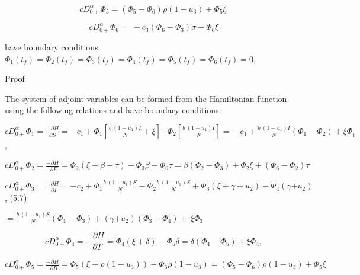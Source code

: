 \documentclass[10pt]{NSP1}
\begin{document}
\begin{equation}
{cD}_{0 +}^{\alpha}\Phi_{5} = \left( \Phi_{5} - \Phi_{6} \right)\rho\left( 1 - u_{3} \right) + \Phi_{5}\xi\ 

\end{equation}

\begin{equation}
{cD}_{0 +}^{\alpha}\Phi_{6} = \  - c_{3}\left( \Phi_{6} - \Phi_{3} \right)\sigma + \Phi_{6}\xi

\end{equation}

have boundary conditions $\Phi_{1}\left( t_{f} \right) = \Phi_{2}\left( t_{f} \right) = \Phi_{3}\left( t_{f} \right) = \Phi_{4}\left( t_{f} \right) = \Phi_{5}\left( t_{f} \right) = \Phi_{6}\left( t_{f} \right) = 0,$

Proof

The system of adjoint variables can be formed from the Hamiltonian function using the following relations and have boundary conditions.

${cD}_{0 +}^{\alpha}\Phi_{1} = \frac{- \partial H}{\partial S} = {- c}_{1} + \Phi_{1}\left\lbrack \frac{b\ \left( 1 - u_{1} \right)I}{N} + \xi \right\rbrack{- \Phi}_{2}\left\lbrack \frac{b\ \left( 1 - u_{1} \right)I}{N} \right\rbrack = \ {- c}_{1} + \frac{b\ \left( 1 - u_{1} \right)I}{N}\left( \Phi_{1} - \Phi_{2} \right) + {\xi\Phi}_{1}$,

${cD}_{0 +}^{\alpha}\Phi_{2} = \frac{- \partial H}{\ \ \partial E} = \Phi_{2}(\xi + \beta - \tau) - \Phi_{3}\beta + \Phi_{6}\tau = \beta\left( \Phi_{2} - \Phi_{3} \right) + \Phi_{2}\xi + (\Phi_{6} - \Phi_{2})\tau$

${cD}_{0 +}^{\alpha}\Phi_{3} = \frac{- \partial H}{\ \ \partial I} = - c_{2} + \Phi_{1}\frac{b\ \left( 1 - u_{1} \right)S}{N} - \Phi_{2}\frac{b\ \left( 1 - u_{1} \right)S}{N} + \Phi_{3}\left( \xi + \gamma + u_{2} \right) - \Phi_{4}(\gamma{+ u}_{2})$, (5.7)

$= \frac{b\ \left( 1 - u_{1} \right)S}{N}\left( \Phi_{1} - \Phi_{3} \right) + (\gamma{+ u}_{2})\left( \Phi_{3} - \Phi_{4} \right) + \ \xi\Phi_{3}\ $

\begin{equation}
{cD}_{0 +}^{\alpha}\Phi_{4} = \frac{- \partial H}{\ \ \partial T} = \Phi_{4}(\xi + \delta) - \Phi_{5}\delta = \delta\left( \Phi_{4} - \Phi_{5} \right) + \xi\Phi_{4},

\end{equation}

${cD}_{0 +}^{\alpha}\Phi_{5} = \frac{- \partial H}{\ \ \partial R} = \Phi_{5}\left( \xi + \rho\left( 1 - u_{3} \right) \right) - \Phi_{6}\rho\left( 1 - u_{3} \right) = \left( \Phi_{5} - \Phi_{6} \right)\rho\left( 1 - u_{3} \right) + \Phi_{5}\xi$
\end{document}
